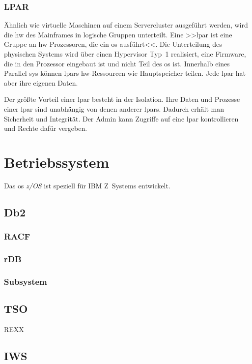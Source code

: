 \subsubsection{LPAR}

Ähnlich wie virtuelle Maschinen auf einem Servercluster ausgeführt werden, wird die \ac{hw} des Mainframes in logische Gruppen unterteilt. Eine >>\ac{lpar} ist eine Gruppe an \ac{hw}-Prozessoren, die ein \ac{os} ausführt<<\cite{redbook.1}. Die Unterteilung des physischen Systems wird über einen Hypervisor Typ~1 realisiert, eine Firmware, die in den Prozessor eingebaut ist und nicht Teil des \ac{os} ist. Innerhalb eines Parallel \ac{sys} können \acp{lpar} \ac{hw}-Ressourcen wie Hauptspeicher teilen. Jede \ac{lpar} hat aber ihre eigenen Daten.

Der größte Vorteil einer \ac{lpar} besteht in der Isolation. Ihre Daten und Prozesse einer \ac{lpar} sind unabhängig von denen anderer \acp{lpar}. Dadurch erhält man Sicherheit und Integrität. Der Admin kann Zugriffe auf eine \ac{lpar} kontrollieren und Rechte dafür vergeben. 

\section[z/OS]{Betriebssystem}
Das \ac{os} \emph{z/OS} ist speziell für IBM Z~Systems entwickelt. 


\subsection{Db2}


\subsubsection{RACF}


\subsubsection{rDB}


\subsubsection{Subsystem}

\subsection{TSO}
REXX

\subsection{IWS}